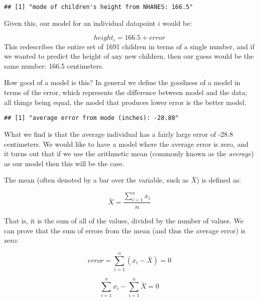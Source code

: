 \documentclass[]{book}
\newenvironment{Shaded}{\begin{snugshade}}{\end{snugshade}}
\newcommand{\KeywordTok}[1]{\textcolor[rgb]{0.13,0.29,0.53}{\textbf{#1}}}
\newcommand{\StringTok}[1]{\textcolor[rgb]{0.31,0.60,0.02}{#1}}
\newcommand{\CommentTok}[1]{\textcolor[rgb]{0.56,0.35,0.01}{\textit{#1}}}
\newcommand{\OperatorTok}[1]{\textcolor[rgb]{0.81,0.36,0.00}{\textbf{#1}}}
\newcommand{\NormalTok}[1]{#1}
\theoremstyle{definition}
\theoremstyle{definition}
\theoremstyle{definition}
\theoremstyle{remark}
\begin{document}
\begin{verbatim}
## [1] "mode of children's height from NHANES: 166.5"
\end{verbatim}

Given this, our model for an individual datapoint \(i\) would be:

\[
height_i = 166.5 + error
\] This redescribes the entire set of 1691 children in terms of a single
number, and if we wanted to predict the height of any new children, then
our guess would be the same number: 166.5 centimeters.

How good of a model is this? In general we define the goodness of a
model in terms of the error, which represents the difference between
model and the data; all things being equal, the model that produces
lower error is the better model.

\begin{Shaded}
\end{Shaded}

\begin{verbatim}
## [1] "average error from mode (inches): -28.80"
\end{verbatim}

What we find is that the average individual has a fairly large error of
-28.8 centimeters. We would like to have a model where the average error
is zero, and it turns out that if we use the arithmetic mean (commonly
known as the \emph{average}) as our model then this will be the case.

The mean (often denoted by a bar over the variable, such as \(\bar{X}\))
is defined as:

\[
\bar{X} = \frac{\sum_{i=1}^{n}x_i}{n}
\]

That is, it is the sum of all of the values, divided by the number of
values. We can prove that the sum of errors from the mean (and thus the
average error) is zero:

\[
error = \sum_{i=1}^{n}(x_i - \bar{X}) = 0
\]

\[
\sum_{i=1}^{n}x_i - \sum_{i=1}^{n}\bar{X}=0
\]
\end{document}
